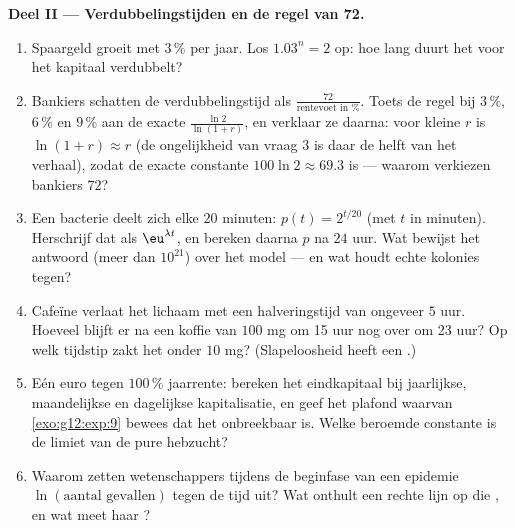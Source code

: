 \begin{problem}
\medskip
\noindent\textbf{Deel II --- Verdubbelingstijden en de regel van 72.}
\begin{enumerate}[resume]
  \item Spaargeld groeit met $3\,\%$ per jaar. Los $1.03^n = 2$ op: hoe lang
        duurt het voor het kapitaal verdubbelt?
  \item Bankiers schatten de verdubbelingstijd als
        $\frac{72}{\text{rentevoet in }\%}$. Toets de regel bij $3\,\%$,
        $6\,\%$ en $9\,\%$ aan de exacte $\frac{\ln 2}{\ln(1 + r)}$, en
        verklaar ze daarna: voor kleine $r$ is $\ln(1 + r) \approx r$ (de
        ongelijkheid van vraag 3 is daar de helft van het verhaal), zodat de
        exacte constante $100 \ln 2 \approx 69.3$ is --- waarom verkiezen
        bankiers $72$?
  \item Een bacterie deelt zich elke $20$ minuten: $p(t) = 2^{t/20}$ (met $t$
        in minuten). Herschrijf dat als $\eu^{\lambda t}$, en bereken daarna
        $p$ na $24$ uur. Wat bewijst het antwoord (meer dan $10^{21}$) over
        het model --- en wat houdt echte kolonies tegen?
  \item Cafeïne verlaat het lichaam met een halveringstijd van ongeveer $5$
        uur. Hoeveel blijft er na een koffie van $100$ mg om 15 uur nog over
        om 23 uur? Op welk tijdstip zakt het onder $10$ mg? (Slapeloosheid
        heeft een .)
  \item Eén euro tegen $100\,\%$ jaarrente: bereken het eindkapitaal bij
        jaarlijkse, maandelijkse en dagelijkse kapitalisatie, en geef het
        plafond waarvan \cref{exo:g12:exp:9} bewees dat het onbreekbaar is.
        Welke beroemde constante is de limiet van de pure hebzucht?
  \item Waarom zetten wetenschappers tijdens de beginfase van een epidemie
        $\ln(\text{aantal gevallen})$ tegen de tijd uit? Wat onthult een
        rechte lijn op die , en wat meet haar
        ?
\end{enumerate}


\end{problem}
